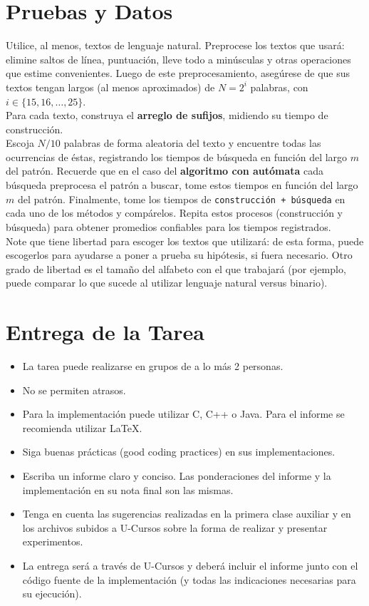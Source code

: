 \documentclass[dcc,uchile]{fcfmcourse}
\begin{document}
\section{Pruebas y Datos}
Utilice, al menos, textos de lenguaje natural. Preprocese los textos que usará: elimine saltos de línea, puntuación, lleve todo a minúsculas y otras operaciones que estime convenientes. Luego de este preprocesamiento, asegúrese de que sus textos tengan largos (al menos aproximados) de $N = 2^i$ palabras, con $i \in \{15, 16, \ldots, 25\}$.\\
Para cada texto, construya el \textbf{arreglo de sufijos}, midiendo su tiempo de construcción.\\
Escoja $N/10$ palabras de forma aleatoria del texto y encuentre todas las ocurrencias de éstas, registrando los tiempos de búsqueda en función del largo $m$ del patrón. Recuerde que en el caso del \textbf{algoritmo con autómata} cada búsqueda preprocesa el patrón a buscar, tome estos tiempos en función del largo $m$ del patrón. Finalmente, tome los tiempos de \texttt{construcción + búsqueda} en cada uno de los métodos y compárelos. Repita estos procesos (construcción y búsqueda) para obtener promedios confiables para los tiempos registrados.\\
Note que tiene libertad para escoger los textos que utilizará: de esta forma, puede escogerlos para ayudarse a poner a prueba su hipótesis, si fuera necesario. Otro grado de libertad es el tamaño del alfabeto con el que trabajará (por ejemplo, puede comparar lo que sucede al utilizar lenguaje natural versus binario).
\newpage
\section{Entrega de la Tarea}
\begin{itemize}
    \item La tarea puede realizarse en grupos de a lo más 2 personas.
    \item No se permiten atrasos.
    \item Para la implementación puede utilizar C, C++ o Java. Para el informe se recomienda utilizar \LaTeX .
    \item Siga buenas prácticas (good coding practices) en sus implementaciones.
    \item Escriba un informe claro y conciso. Las ponderaciones del informe y la implementación en su nota final son las mismas.
    \item Tenga en cuenta las sugerencias realizadas en la primera clase auxiliar y en los archivos subidos a U-Cursos sobre la forma de realizar y presentar experimentos.
    \item La entrega será a través de U-Cursos y deberá incluir el informe junto con el código fuente de la implementación (y todas las indicaciones necesarias para su ejecución).
\end{itemize}
\end{document}
